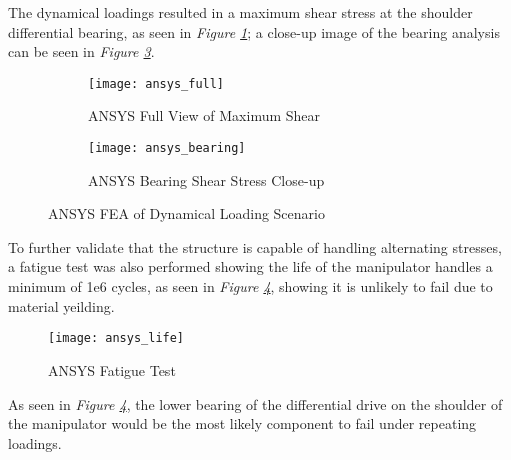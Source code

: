 The dynamical loadings resulted in a maximum shear stress at the shoulder differential bearing, as seen in \emph{Figure \ref{fig:ansys_full}}; a close-up image of the bearing analysis can be seen in \emph{Figure \ref{fig:ansys_bearing}}.

\begin{figure}[htp]
  \center
  \begin{subfigure}[t]{0.5\textwidth}
  \center
  \texttt{[image: ansys\_full]}
  \caption{ANSYS Full View of Maximum Shear}
  \label{fig:ansys_full}
\end{subfigure}%
\begin{subfigure}[t]{0.5\textwidth}
  \center
  \texttt{[image: ansys\_bearing]}
  \caption{ANSYS Bearing Shear Stress Close-up}
  \label{fig:ansys_bearing}
\end{subfigure}
  \caption{ANSYS FEA of Dynamical Loading Scenario}
\end{figure}

To further validate that the structure is capable of handling alternating stresses, a fatigue test was also performed showing the life of the manipulator handles a minimum of 1e6 cycles, as seen in \emph{Figure \ref{fig:ansys_life}}, showing it is unlikely to fail due to material yeilding.

\begin{figure}[htp]
  \center
  \texttt{[image: ansys\_life]}
  \caption{ANSYS Fatigue Test}
  \label{fig:ansys_life}
\end{figure}

As seen in \emph{Figure \ref{fig:ansys_life}}, the lower bearing of the differential drive on the shoulder of the manipulator would be the most likely component to fail under repeating loadings.
\newpage
